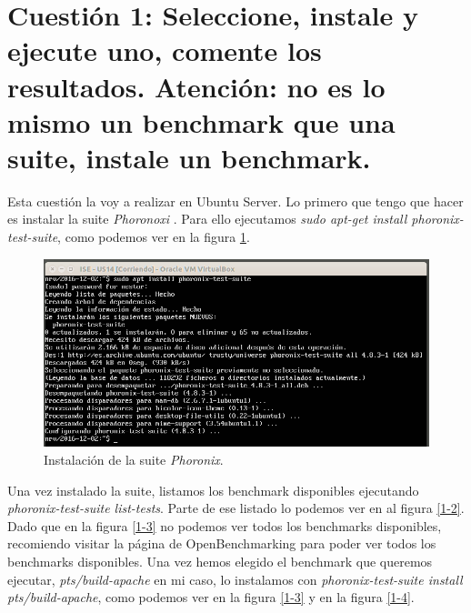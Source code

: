 \documentclass[a4paper,titlepage,12pt]{scrartcl}	%
\numberwithin{figure}{section} %
\numberwithin{table}{section} %
\begin{document}
	\tableofcontents
	\clearpage
	\listoffigures %
	\listoftables %
	\clearpage
	
	\section[Cuestión 1: Seleccione, instale y ejecute uno, comente los resultados. Atención: no es lo mismo un benchmark que una suite, instale un benchmark.]{Cuestión 1: Seleccione, instale y ejecute uno, comente los resultados. Atención: no es lo mismo un benchmark que una suite, instale un benchmark.}
	
	Esta cuestión la voy a realizar en Ubuntu Server. Lo primero que tengo que hacer es instalar la suite \textit{Phoronoxi} \cite{phoronix}. Para ello ejecutamos \textit{sudo apt-get install phoronix-test-suite}, como podemos ver en la figura \ref{1-1}.
	
	\begin{figure}[H]
		\includegraphics[width=\linewidth]{./Imagenes/1-1.png}
		\vspace{-0.5cm}
		\caption[Instalación de la suite \textit{Phoronix}.]{Instalación de la suite \textit{Phoronix}.}
		\label{1-1}
	\end{figure}
	
	Una vez instalado la suite, listamos los benchmark disponibles ejecutando \textit{phoronix-test-suite list-tests}. Parte de ese listado lo podemos ver en al figura \ref{1-2}. Dado que en la figura \ref{1-3} no podemos ver todos los benchmarks disponibles, recomiendo visitar la página de OpenBenchmarking \cite{openbenchmarking} para poder ver todos los benchmarks disponibles. Una vez hemos elegido el benchmark que queremos ejecutar, \textit{pts/build-apache} en mi caso, lo instalamos con \textit{phoronix-test-suite install pts/build-apache}, como podemos ver en la figura \ref{1-3} y en la figura \ref{1-4}.
	
\end{document}
